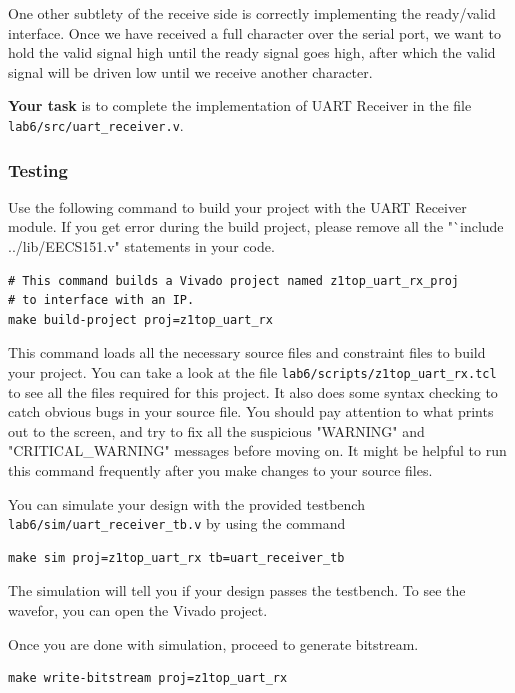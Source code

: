 \documentclass[11pt]{article}
\begin{document}
One other subtlety of the receive side is correctly implementing the ready/valid interface.
Once we have received a full character over the serial port, we want to hold the valid signal high until the ready signal goes high, after which the valid signal will be driven low until we receive another character.

\textbf{Your task} is to complete the implementation of UART Receiver in the file \verb|lab6/src/uart_receiver.v|.

\subsubsection{Testing}

Use the following command to build your project with the UART Receiver module. If you get error during the build project, please remove all the "`include ../lib/EECS151.v" statements in your code.

\begin{verbatim}
# This command builds a Vivado project named z1top_uart_rx_proj
# to interface with an IP.
make build-project proj=z1top_uart_rx
\end{verbatim}

This command loads all the necessary source files and constraint files to build your project. You can take a look at the file \verb|lab6/scripts/z1top_uart_rx.tcl| to see all the files required for this project. It also does some syntax checking to catch obvious bugs in your source file. You should pay attention to what prints out to the screen, and try to fix all the suspicious "WARNING" and "CRITICAL\_WARNING" messages before moving on. It might be helpful to run this command frequently after you make changes to your source files.

You can simulate your design with the provided testbench \verb|lab6/sim/uart_receiver_tb.v| by using the command

\begin{verbatim}
make sim proj=z1top_uart_rx tb=uart_receiver_tb
\end{verbatim}

The simulation will tell you if your design passes the testbench. To see the wavefor, you can open the Vivado project.

Once you are done with simulation, proceed to generate bitstream.

\begin{verbatim}
make write-bitstream proj=z1top_uart_rx
\end{verbatim}
\end{document}
